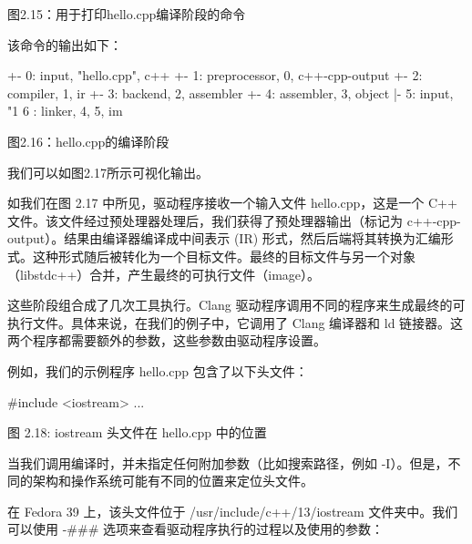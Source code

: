 \begin{center}
图2.15：用于打印hello.cpp编译阶段的命令
\end{center}

该命令的输出如下：

\begin{shell}
            +- 0: input, "hello.cpp", c++
         +- 1: preprocessor, {0}, c++-cpp-output
      +- 2: compiler, {1}, ir
   +- 3: backend, {2}, assembler
+- 4: assembler, {3}, object
|- 5: input, "1%
6 : linker, {4, 5}, im
\end{shell}

\begin{center}
图2.16：hello.cpp的编译阶段
\end{center}

我们可以如图2.17所示可视化输出。


如我们在图 2.17 中所见，驱动程序接收一个输入文件 hello.cpp，这是一个 C++ 文件。该文件经过预处理器处理后，我们获得了预处理器输出（标记为 c++-cpp-output）。结果由编译器编译成中间表示 (IR) 形式，然后后端将其转换为汇编形式。这种形式随后被转化为一个目标文件。最终的目标文件与另一个对象（libstdc++）合并，产生最终的可执行文件（image）。


这些阶段组合成了几次工具执行。Clang 驱动程序调用不同的程序来生成最终的可执行文件。具体来说，在我们的例子中，它调用了 Clang 编译器和 ld 链接器。这两个程序都需要额外的参数，这些参数由驱动程序设置。

例如，我们的示例程序 hello.cpp 包含了以下头文件：

\begin{cpp}
#include <iostream>
...
\end{cpp}

\begin{center}
图 2.18: iostream 头文件在 hello.cpp 中的位置
\end{center}

当我们调用编译时，并未指定任何附加参数（比如搜索路径，例如 -I）。但是，不同的架构和操作系统可能有不同的位置来定位头文件。

在 Fedora 39 上，该头文件位于 /usr/include/c++/13/iostream 文件夹中。我们可以使用 -\#\#\# 选项来查看驱动程序执行的过程以及使用的参数：


